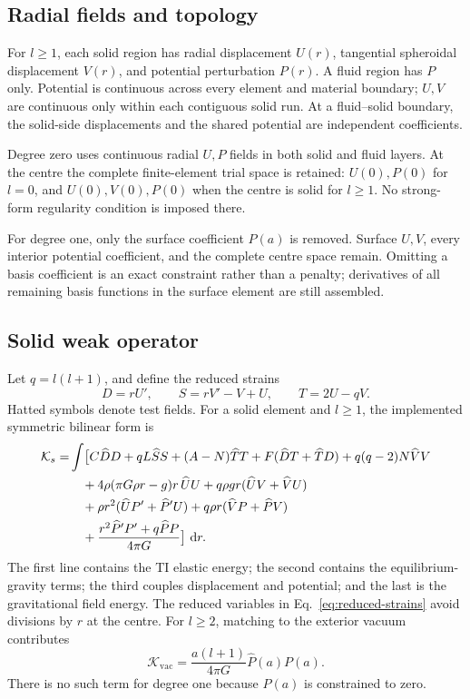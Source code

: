 \documentclass[11pt,a4paper]{article}
\newcommand{\dd}{\,\mathrm{d}}
\begin{document}
\subsection{Radial fields and topology}

For \(l\geq1\), each solid region has radial displacement \(U(r)\),
tangential spheroidal displacement \(V(r)\), and potential perturbation
\(P(r)\).  A fluid region has \(P\) only.  Potential is continuous across
every element and material boundary; \(U,V\) are continuous only within each
contiguous solid run.  At a fluid--solid boundary, the solid-side
displacements and the shared potential are independent coefficients.

Degree zero uses continuous radial \(U,P\) fields in both solid and fluid
layers.  At the centre the complete finite-element trial space is retained:
\(U(0),P(0)\) for \(l=0\), and \(U(0),V(0),P(0)\) when the centre is solid
for \(l\geq1\).  No strong-form regularity condition is imposed there.

For degree one, only the surface coefficient \(P(a)\) is removed.  Surface
\(U,V\), every interior potential coefficient, and the complete centre space
remain.  Omitting a basis coefficient is an exact constraint rather than a
penalty; derivatives of all remaining basis functions in the surface element
are still assembled.

\subsection{Solid weak operator}

Let \(q=l(l+1)\), and define the reduced strains
\begin{equation}
 D=rU',\qquad S=rV'-V+U,\qquad T=2U-qV. \label{eq:reduced-strains}
\end{equation}
Hatted symbols denote test fields.  For a solid element and \(l\geq1\), the
implemented symmetric bilinear form is
\begin{align}
\mathcal{K}_{s}=&\int
\bigl[
 C\widehat{D}D
+qL\widehat{S}S
+(A-N)\widehat{T}T
+F(\widehat{D}T+\widehat{T}D)
+q(q-2)N\widehat{V}V \notag\\
&\quad
+4\rho(\pi G\rho r-g)r\,\widehat{U}U
+q\rho gr(\widehat{U}V+\widehat{V}U) \notag\\
&\quad
+\rho r^2(\widehat{U}P'+\widehat{P}'U)
+q\rho r(\widehat{V}P+\widehat{P}V) \notag\\
&\quad
+\frac{r^2\widehat{P}'P'+q\widehat{P}P}{4\pi G}
\bigr]\,\dd r . \label{eq:solid-form}
\end{align}
The first line contains the TI elastic energy; the second contains the
equilibrium-gravity terms; the third couples displacement and potential; and
the last is the gravitational field energy.  The reduced variables in
Eq.~\eqref{eq:reduced-strains} avoid divisions by \(r\) at the centre.
For \(l\geq2\), matching to the exterior vacuum contributes
\begin{equation}
 \mathcal{K}_{\mathrm{vac}}=
 \frac{a(l+1)}{4\pi G}\widehat{P}(a)P(a). \label{eq:vacuum}
\end{equation}
There is no such term for degree one because \(P(a)\) is constrained to zero.
\end{document}
